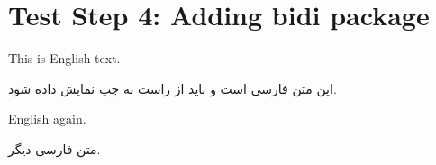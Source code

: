 \documentclass[12pt,a4paper]{article}
\begin{document}
\section*{Test Step 4: Adding bidi package}

This is English text.

\textfarsi{این متن فارسی است و باید از راست به چپ نمایش داده شود.}

English again.

\textfarsi{متن فارسی دیگر.}
\end{document}
